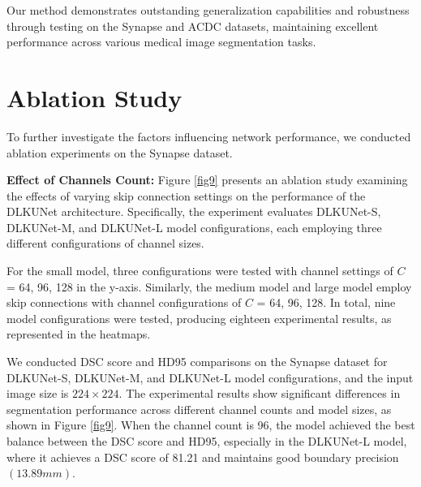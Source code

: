 \documentclass[sn-mathphys-num]{sn-jnl}
\theoremstyle{thmstyleone}%
\theoremstyle{thmstyletwo}%
\theoremstyle{thmstylethree}%
\begin{document}
Our method demonstrates outstanding generalization capabilities and robustness through testing on the Synapse and ACDC datasets,
maintaining excellent performance across various medical image segmentation tasks.

\section{Ablation Study} \label{sec5}

To further investigate the factors influencing network performance, we conducted ablation experiments on the Synapse dataset.

\textbf{Effect of Channels Count:}
Figure \ref{fig9} presents an ablation study examining the effects of varying skip connection settings on the performance of the DLKUNet architecture.
Specifically, the experiment evaluates DLKUNet-S, DLKUNet-M, and DLKUNet-L model configurations, each employing three different configurations of channel sizes.

For the small model, three configurations were tested with channel settings of $C$ = 64, 96, 128 in the y-axis.
Similarly, the medium model and large model employ skip connections with channel configurations of $C$ = 64, 96, 128.
In total, nine model configurations were tested, producing eighteen experimental results, as represented in the heatmaps.

We conducted DSC score and HD95 comparisons on the Synapse dataset for DLKUNet-S, DLKUNet-M, and DLKUNet-L model configurations, and the input image size is \(224\times 224\).
The experimental results show significant differences in segmentation performance across different channel counts and model sizes, as shown in Figure \ref{fig9}.
When the channel count is 96, the model achieved the best balance between the DSC score and HD95, especially in the DLKUNet-L model, where it achieves a DSC score of 81.21 and maintains good boundary precision \((13.89mm)\).
\end{document}
